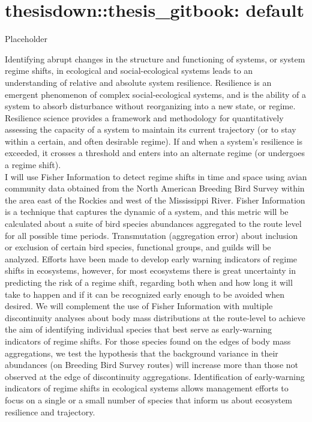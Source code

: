 \documentclass[12pt,twoside,openany]{reedthesis}
\begin{document}
\hypertarget{thesisdownthesis_gitbook-default}{%
\chapter{thesisdown::thesis\_gitbook: default}\label{thesisdownthesis_gitbook-default}}

Placeholder

Identifying abrupt changes in the structure and functioning of systems, or system regime shifts, in ecological and social-ecological systems leads to an understanding of relative and absolute system resilience. Resilience is an emergent phenomenon of complex social-ecological systems, and is the ability of a system to absorb disturbance without reorganizing into a new state, or regime. Resilience science provides a framework and methodology for quantitatively assessing the capacity of a system to maintain its current trajectory (or to stay within a certain, and often desirable regime). If and when a system's resilience is exceeded, it crosses a threshold and enters into an alternate regime (or undergoes a regime shift).\\
I will use Fisher Information to detect regime shifts in time and space using avian community data obtained from the North American Breeding Bird Survey within the area east of the Rockies and west of the Mississippi River. Fisher Information is a technique that captures the dynamic of a system, and this metric will be calculated about a suite of bird species abundances aggregated to the route level for all possible time periods. Transmutation (aggregation error) about inclusion or exclusion of certain bird species, functional groups, and guilds will be analyzed. Efforts have been made to develop early warning indicators of regime shifts in ecosystems, however, for most ecosystems there is great uncertainty in predicting the risk of a regime shift, regarding both when and how long it will take to happen and if it can be recognized early enough to be avoided when desired. We will complement the use of Fisher Information with multiple discontinuity analyses about body mass distributions at the route-level to achieve the aim of identifying individual species that best serve as early-warning indicators of regime shifts. For those species found on the edges of body mass aggregations, we test the hypothesis that the background variance in their abundances (on Breeding Bird Survey routes) will increase more than those not observed at the edge of discontinuity aggregations. Identification of early-warning indicators of regime shifts in ecological systems allows management efforts to focus on a single or a small number of species that inform us about ecosystem resilience and trajectory.\\
\end{document}
